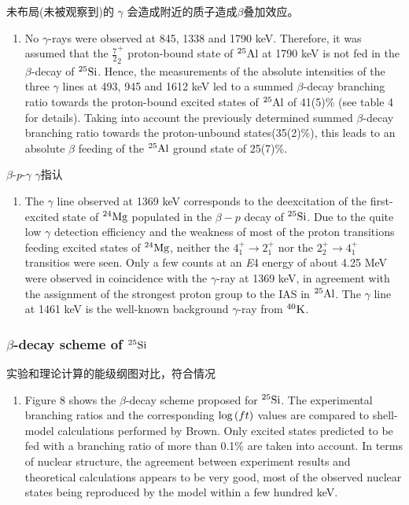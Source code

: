 \documentclass[a4paper]{article}
\begin{document}
未布局(未被观察到)的 $\gamma$ 会造成附近的质子造成$\beta$叠加效应。
\begin{enumerate}
    \item No $\gamma$-rays were observed at 845, 1338 and 1790 keV. Therefore, it was assumed that the $\frac{7}{2}_{2}^{+}$ proton-bound state of $^{25}\textnormal{Al}$ at 1790 keV is not fed in the $\beta$-decay of $^{25}\textnormal{Si}$. Hence, the measurements of the absolute intensities of the three $\gamma$ lines at 493, 945 and 1612 keV led to a summed $\beta$-decay branching ratio towards the proton-bound excited states of $^{25}\textnormal{Al}$ of 41(5)\% (see table 4 for details). Taking into account the previously determined summed $\beta$-decay branching ratio towards the proton-unbound states(35(2)\%), this leads to an absolute $\beta$ feeding of the $^{25}\textnormal{Al}$ ground state of 25(7)\%.
\end{enumerate}

$\beta$-\textit{p}-$\gamma$ $\gamma$指认
\begin{enumerate}
    \item The $\gamma$ line observed at 1369 keV corresponds to the deexcitation of the first-excited state of $^{24}\textnormal{Mg}$ populated in the $\beta-p$ decay of $^{25}\textnormal{Si}$. Due to the quite low $\gamma$ detection efficiency and the weakness of most of the proton transitions feeding excited states of $^{24}\textnormal{Mg}$, neither the $4_{1}^{+}\to 2_{1}^{+}$ nor the $2_{2}^{+}\to 4_{1}^{+}$ transitios were seen. Only a few counts at an \textit{E}4 energy of about 4.25 MeV were observed in coincidence with the $\gamma$-ray at 1369 keV, in agreement with the assignment of the strongest proton group to the IAS in $^{25}\textnormal{Al}$. The $\gamma$ line at 1461 keV is the well-known background $\gamma$-ray from $^{40}\textnormal{K}$.
\end{enumerate}

\subsubsection{$\beta$-decay scheme of $^{25}\textnormal{Si}$}
实验和理论计算的能级纲图对比，符合情况
\begin{enumerate}
    \item Figure 8 shows the $\beta$-decay scheme proposed for $^{25}\textnormal{Si}$. The experimental branching ratios and the corresponding $\textnormal{log}\left( ft \right)$ values are compared to shell-model calculations performed by Brown. Only excited states predicted to be fed with a branching ratio of more than 0.1\% are taken into account. In terms of nuclear structure, the agreement between experiment results and theoretical calculations appears to be very good, most of the observed nuclear states being reproduced by the model within a few hundred keV.
\end{enumerate}
\end{document}
